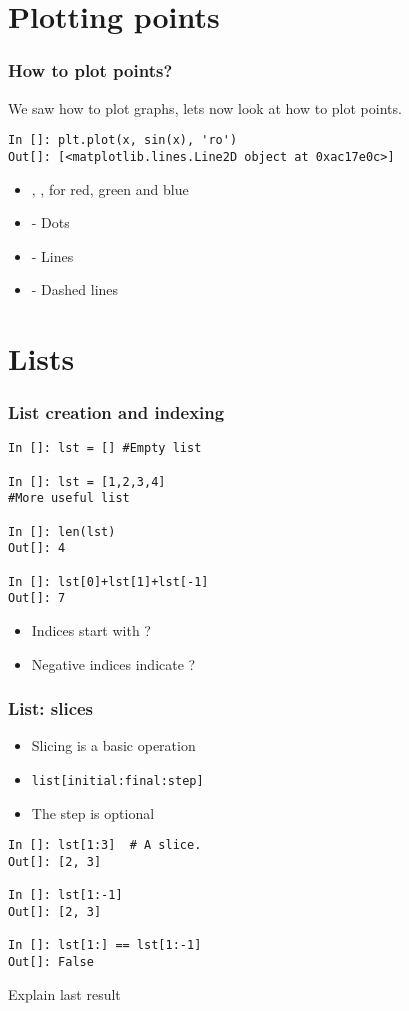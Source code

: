 \documentclass[14pt,compress]{beamer}
\newcounter{time}
\newcommand{\inctime}[1]{\addtocounter{time}{#1}{\tiny \thetime\ m}}
\newcommand{\typ}[1]{\lstinline{#1}}
\newcommand{\kwrd}[1]{ \texttt{\textbf{\color{blue}{#1}}}  }
\begin{document}
\section{Plotting points}
\begin{frame}[fragile]
\frametitle{How to plot points?}
We saw how to plot graphs, lets now look at how to plot points.\\
\begin{lstlisting}
In []: plt.plot(x, sin(x), 'ro')
Out[]: [<matplotlib.lines.Line2D object at 0xac17e0c>]
\end{lstlisting}
\begin{itemize}
  \item \kwrd{'r'},\kwrd{'g'},\kwrd{'b'} for red, green and blue
  \item \kwrd{'o'} - Dots
  \item \kwrd{'-'} - Lines
  \item \kwrd{'- -'} - Dashed lines
\end{itemize}
\inctime{5}
\end{frame}

\section{Lists}

\begin{frame}[fragile]
  \frametitle{List creation and indexing}
\begin{lstlisting}
In []: lst = [] #Empty list

In []: lst = [1,2,3,4] 
#More useful list

In []: len(lst)
Out[]: 4

In []: lst[0]+lst[1]+lst[-1]
Out[]: 7
\end{lstlisting}
\begin{itemize}
  \item Indices start with ?
  \item Negative indices indicate ?
  \end{itemize}
\end{frame}

\begin{frame}[fragile]
  \frametitle{List: slices}
  \begin{itemize}
  \item Slicing is a basic operation
  \item \typ{list[initial:final:step]}
  \item  The step is optional
  \end{itemize}
\begin{lstlisting}
In []: lst[1:3]  # A slice.
Out[]: [2, 3]

In []: lst[1:-1]
Out[]: [2, 3]

In []: lst[1:] == lst[1:-1]
Out[]: False
\end{lstlisting}
Explain last result
\end{frame}
\end{document}
